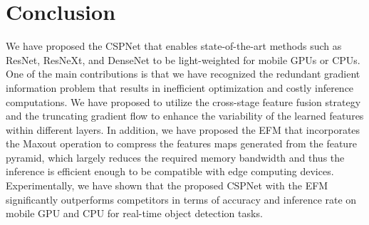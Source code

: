 \documentclass{article}
\begin{document}
\section{Conclusion}

We have proposed the CSPNet that enables state-of-the-art methods such as ResNet, ResNeXt, and DenseNet to be light-weighted for mobile GPUs or CPUs. One of the main contributions is that we have recognized the redundant gradient information problem that results in inefficient optimization and costly inference computations. We have proposed to utilize the cross-stage feature fusion strategy and the truncating gradient flow to enhance the variability of the learned features within different layers. In addition, we have proposed the EFM that incorporates the Maxout operation to compress the features maps generated from the feature pyramid, which largely reduces the required memory bandwidth and thus the inference is efficient enough to be compatible with edge computing devices. Experimentally, we have shown that the proposed CSPNet with the EFM significantly outperforms competitors in terms of accuracy and inference rate on mobile GPU and CPU for real-time object detection tasks.


{\small
	  
	
}
\end{document}
